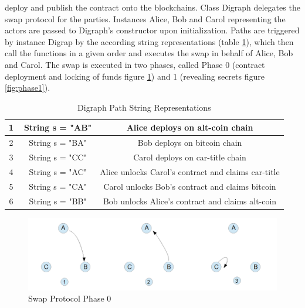 deploy and publish the contract onto the blockchains. Class Digraph delegates the swap protocol for the parties. Instances Alice, Bob and Carol representing the actors are passed to Digraph's constructor upon initialization. Paths are triggered by instance Digrap by the according string representations (table \ref{table:2}), which then call the functions in a given order and executes the swap in behalf of Alice, Bob and Carol. The swap is executed in two phases, called Phase 0 (contract deployment and locking of funds figure \ref{fig:phase0}) and 1 (revealing secrets figure \ref{fig:phase1}). \newline

\begin{table}[h!]
	\centering
	\begin{tabular}{|c | c | c |} 
		\hline 
		\textcircled{1} & String s = "AB" & Alice deploys on alt-coin chain\\ [0.5ex] 
		\hline
		\textcircled{2} & String s = "BA" & Bob deploys on bitcoin chain\\ 
		\hline
		\textcircled{3} & String s = "CC" & Carol deploys on car-title chain \\
		\hline
		\textcircled{4} & String s = "AC" & Alice unlocks Carol's contract and claims car-title \\ [1ex] 
		\hline
		\textcircled{5} & String s = "CA" & Carol unlocks Bob's contract and claims bitcoin \\ [1ex] 
		\hline
		\textcircled{6} & String s = "BB" & Bob unlocks Alice's contract and claims alt-coin \\ [1ex] 
		\hline
	\end{tabular}
	\caption{Digraph Path String Representations}
	\label{table:2}
\end{table}

\begin{figure}[h]
	\begin{center}
		\includegraphics[width=0.6\paperwidth]{phase0}	
		\caption{Swap Protocol Phase 0}
		\label{fig:phase0}
	\end{center}
\end{figure}

